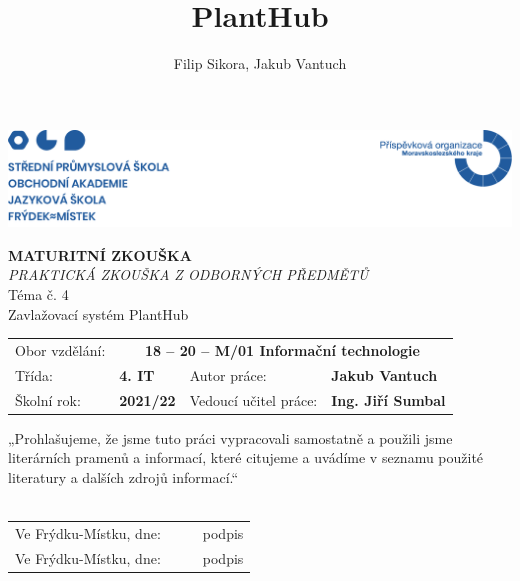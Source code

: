 \documentclass[12pt,a4paper]{article}
\title{PlantHub}
\author{Filip Sikora, Jakub Vantuch}
\date{}
\begin{document}
\renewcommand\refname{}

\begin{titlepage}
	\begin{adjustwidth}{-20mm}{-7.5mm} 
		\vspace*{-1.5cm}
		\noindent\includegraphics[width=\linewidth]{header.png}
	\end{adjustwidth}
	\begin{center}
		\vspace*{0.2cm}
		\Huge\textbf{MATURITNÍ ZKOUŠKA}
		\vspace*{1cm} \\
		\large \emph{PRAKTICKÁ ZKOUŠKA Z ODBORNÝCH PŘEDMĚTŮ}
		\vspace*{1cm} \\
		\Large Téma č. 4 \\
		\vspace*{1cm}
		\Large Zavlažovací systém PlantHub \\
		\vfill
		\normalsize
	\end{center}
	\begin{tabularx}{\textwidth}{l@{\hskip 0.5cm}XXl}
		Obor vzdělání: & \multicolumn{3}{c}{\textbf{18 – 20 – M/01 Informační technologie}} \\[10pt]
		Třída: & \textbf{4. IT} & Autor práce: & \textbf{Jakub Vantuch} \\[10pt]
		Školní rok: & \textbf{2021/22} & Vedoucí učitel práce: & \textbf{Ing. Jiří Sumbal}
		\vspace*{1cm}
	\end{tabularx}
	„Prohlašujeme, že jsme tuto práci vypracovali samostatně a použili jsme literárních pramenů a informací, které citujeme a uvádíme v seznamu použité literatury a dalších zdrojů informací.“ \\
	\vspace*{0.5cm} \\
	\renewcommand{\arraystretch}{2}
	\begin{tabularx}{\textwidth}{l@{\hskip 0.75cm}X@{\hskip 1.5cm}X@{\hskip 0.75cm}l}
		Ve Frýdku-Místku, dne: & \dotfill & \dotfill & podpis \\
		Ve Frýdku-Místku, dne: & \dotfill & \dotfill & podpis \\
	\end{tabularx}
\end{titlepage}
\end{document}
